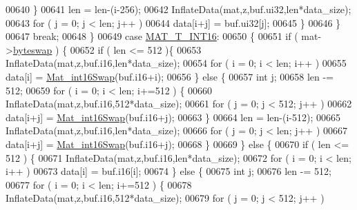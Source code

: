 \begin{DoxyCode}
00640                     \}
00641                     len = len-(i-256);
00642                     InflateData(mat,z,buf.ui32,len*data\_size);
00643                     \textcolor{keywordflow}{for} ( j = 0; j < len; j++ )
00644                         data[i+j] = buf.ui32[j];
00645                 \}
00646             \}
00647             \textcolor{keywordflow}{break};
00648         \}
00649         \textcolor{keywordflow}{case} \hyperlink{group___m_a_t_ggacf7b3b879282b7ab3a51190e49bf3453a8c5b2e381946e95ea8d81ac216743302}{MAT\_T\_INT16}:
00650         \{
00651             \textcolor{keywordflow}{if} ( mat->\hyperlink{struct__mat__t_a99d207977af5e04941ace56d71817a40}{byteswap} ) \{
00652                 \textcolor{keywordflow}{if} ( len <= 512 )\{
00653                     InflateData(mat,z,buf.i16,len*data\_size);
00654                     \textcolor{keywordflow}{for} ( i = 0; i < len; i++ )
00655                         data[i] = \hyperlink{endian_8c_a741eb8019dbc3e8addfc0e75adb0dd90}{Mat\_int16Swap}(buf.i16+i);
00656                 \} \textcolor{keywordflow}{else} \{
00657                     \textcolor{keywordtype}{int} j;
00658                     len -= 512;
00659                     \textcolor{keywordflow}{for} ( i = 0; i < len; i+=512 ) \{
00660                         InflateData(mat,z,buf.i16,512*data\_size);
00661                         \textcolor{keywordflow}{for} ( j = 0; j < 512; j++ )
00662                             data[i+j] = \hyperlink{endian_8c_a741eb8019dbc3e8addfc0e75adb0dd90}{Mat\_int16Swap}(buf.i16+j);
00663                     \}
00664                     len = len-(i-512);
00665                     InflateData(mat,z,buf.i16,len*data\_size);
00666                     \textcolor{keywordflow}{for} ( j = 0; j < len; j++ )
00667                         data[i+j] = \hyperlink{endian_8c_a741eb8019dbc3e8addfc0e75adb0dd90}{Mat\_int16Swap}(buf.i16+j);
00668                 \}
00669             \} \textcolor{keywordflow}{else} \{
00670                 \textcolor{keywordflow}{if} ( len <= 512 ) \{
00671                     InflateData(mat,z,buf.i16,len*data\_size);
00672                     \textcolor{keywordflow}{for} ( i = 0; i < len; i++ )
00673                         data[i] = buf.i16[i];
00674                 \} \textcolor{keywordflow}{else} \{
00675                     \textcolor{keywordtype}{int} j;
00676                     len -= 512;
00677                     \textcolor{keywordflow}{for} ( i = 0; i < len; i+=512 ) \{
00678                         InflateData(mat,z,buf.i16,512*data\_size);
00679                         \textcolor{keywordflow}{for} ( j = 0; j < 512; j++ )

\end{DoxyCode}
